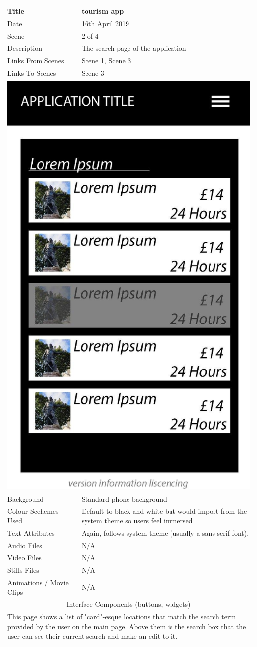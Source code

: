 \hspace{-1cm}
	\begin{tabular}{p{4cm}p{10cm}}
		\hline
		Title & tourism app \\
		\hline
		Date & 16th April 2019 \\
		\hline
		Scene & 2 of 4 \\
		\hline
		Description & The search page of the application \\
		\hline
		Links From Scenes & Scene 1, Scene 3 \\
		\hline
		Links To Scenes & Scene 3 \\
		\hline
		\multicolumn{2}{c}{\includegraphics[width=0.5\linewidth]{images/screen1.jpg}} \\
		\hline
		Background & Standard phone background \\
		\hline
		Colour Scehemes Used & Default to black and white but would import from the system theme so users feel immersed \\
		\hline
		Text Attributes & Again, follows system theme (usually a sans-serif font). \\
		\hline
		Audio Files & N/A \\
		\hline
		Video Files & N/A \\
		\hline
		Stills Files & N/A \\
		\hline
		Animations / Movie Clips & N/A \\
		\hline
		\multicolumn{2}{c}{Interface Components (buttons, widgets)} \\
		\hline
		\multicolumn{2}{p{14cm}}{ This page shows a list of "card"-esque locations that match the search term provided by the user on the main page. Above them is the search box that the user can see their current search and make an edit to it.  } \\
		\hline
	\end{tabular}
